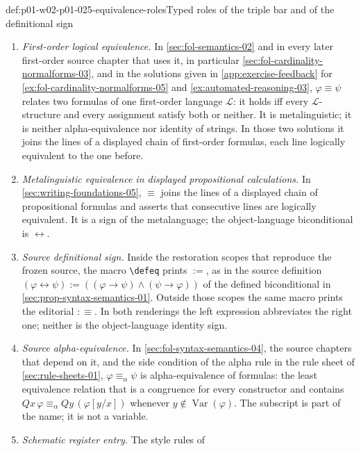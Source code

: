 \begin{hbconvention}{def:p01-w02-p01-025-equivalence-roles}{Typed roles of the triple bar and of the definitional sign}
\begin{enumerate}
  \item \emph{First-order logical equivalence.}  In
  \cref{sec:fol-semantics-02} and in every later first-order source chapter
  that uses it, in particular \cref{sec:fol-cardinality-normalforms-03},
  and in the solutions given in \cref{app:exercise-feedback} for
  \cref{ex:fol-cardinality-normalforms-05} and
  \cref{ex:automated-reasoning-03}, \(\varphi\equiv\psi\) relates two
  formulas of one first-order language \(\mathcal L\): it holds iff every
  \(\mathcal L\)-structure and every assignment satisfy both or neither.  It
  is metalinguistic; it is neither alpha-equivalence nor identity of strings.
  In those two solutions it joins the lines of a displayed chain of
  first-order formulas, each line logically equivalent to the one before.
  \item \emph{Metalinguistic equivalence in displayed propositional
  calculations.}  In \cref{sec:writing-foundations-05}, \(\equiv\) joins the
  lines of a displayed chain of propositional formulas and asserts that
  consecutive lines are logically equivalent.  It is a sign of the
  metalanguage; the object-language biconditional is \(\leftrightarrow\).
  \item \emph{Source definitional sign.}  Inside the restoration scopes that
  reproduce the frozen source, the macro \texttt{\textbackslash defeq} prints
  \(\mathrel{:=}\), as in the source definition
  \((\varphi\leftrightarrow\psi)\mathrel{:=}((\varphi\to\psi)\land(\psi\to\varphi))\)
  of the defined biconditional in \cref{sec:prop-syntax-semantics-01}.
  Outside those scopes the same macro prints the editorial
  \(\mathrel{:\equiv}\).  In both renderings the left expression abbreviates
  the right one; neither is the object-language identity sign.
  \item \emph{Source alpha-equivalence.}  In
  \cref{sec:fol-syntax-semantics-04}, the source chapters that depend on
  it, and the side condition of the alpha rule in the rule sheet of
  \cref{sec:rule-sheets-01}, \(\varphi\equiv_\alpha\psi\) is
  alpha-equivalence of formulas: the least
  equivalence relation that is a congruence for every constructor and
  contains \(Qx\,\varphi\equiv_\alpha Qy\,(\varphi[y/x])\) whenever
  \(y\notin\operatorname{Var}(\varphi)\).  The subscript is part of the name;
  it is not a variable.
  \item \emph{Schematic register entry.}  The style rules of

\end{enumerate}
\end{hbconvention}
